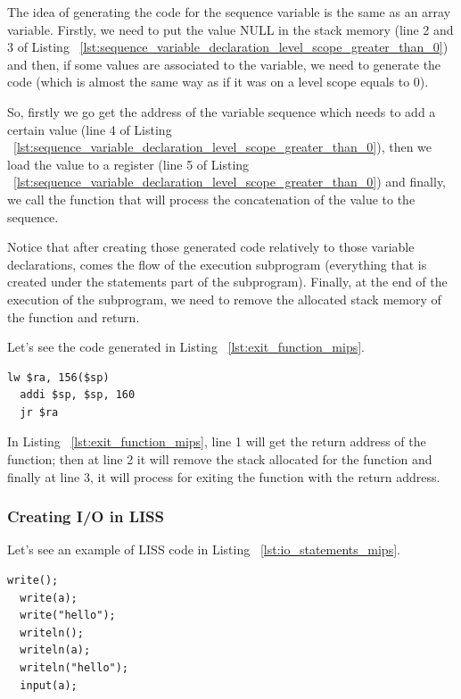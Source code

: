 \documentclass[
  oneside,
  11pt, a4paper,
  footinclude=true,
  headinclude=true,
  cleardoublepage=empty
]{scrbook}
\begin{document}
The idea of  generating the code for the sequence variable is the same as an array variable.
Firstly, we need to put the value NULL in the stack memory (line 2 and 3 of Listing ~\ref{lst:sequence_variable_declaration_level_scope_greater_than_0}) and then, if some values are associated to the variable, we need to generate the code (which is almost the same way as if it was on a level scope equals to 0).

So, firstly we go get the address of the variable sequence which needs to add a certain value (line 4 of Listing ~\ref{lst:sequence_variable_declaration_level_scope_greater_than_0}), then we load the value to a register (line 5 of Listing ~\ref{lst:sequence_variable_declaration_level_scope_greater_than_0}) and finally, we call the function that will process the concatenation of the value to the sequence.

Notice that after creating those generated code relatively to those variable declarations, comes the flow of the execution subprogram (everything that is created under the statements part of the subprogram). Finally, at the end of the execution of the subprogram, we need to remove the allocated stack memory of the function and return.

Let's see the code generated in Listing ~\ref{lst:exit_function_mips}.

\begin{lstlisting}[caption={Exiting the function in MIPS assembly code},label={lst:exit_function_mips}]
  lw $ra, 156($sp)		
  addi $sp, $sp, 160		
  jr $ra	
\end{lstlisting}

In Listing ~\ref{lst:exit_function_mips}, line 1 will get the return address of the function; then at line 2 it will remove the stack allocated for the function and finally at line 3, it will process for exiting the function with the return address.

\subsubsection{Creating I/O in LISS}


Let's see an example of LISS code in Listing ~\ref{lst:io_statements_mips}.

\begin{lstlisting}[caption={Example of I/O statements in LISS},label={lst:io_statements_mips}]
  write();
  write(a);
  write("hello");
  writeln();
  writeln(a);
  writeln("hello");
  input(a);
\end{lstlisting}
\end{document}
